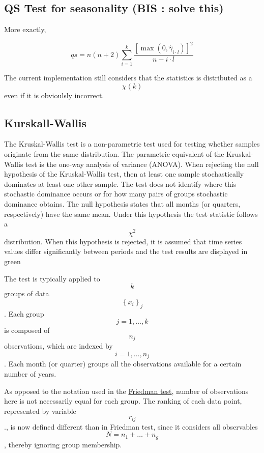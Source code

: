 \documentclass[
]{book}
\begin{document}
\hypertarget{qs-test-for-seasonality-bis-solve-this}{%
\subsection{QS Test for seasonality (BIS : solve this)}\label{qs-test-for-seasonality-bis-solve-this}}

More exactly,

\[ qs=n \left(n+2\right)\sum_{i=1}^k\frac{\left[ \max  \left(0, \hat\gamma_{i \cdot l}\right)\right]^2}{n-i \cdot l}\]

The current implementation still considers that the statistics is distributed as a
\[\chi \left(k\right)\]
even if it is obvioulsly incorrect.

\hypertarget{kurskall-wallis}{%
\subsection{Kurskall-Wallis}\label{kurskall-wallis}}

The Kruskal-Wallis test is a non-parametric test used for testing whether samples originate from the same distribution.
The parametric equivalent of the Kruskal-Wallis test is the one-way analysis of variance (ANOVA).
When rejecting the null hypothesis of the Kruskal-Wallis test, then at least one sample stochastically dominates at least one other sample.
The test does not identify where this stochastic dominance occurs or for how many pairs of groups stochastic dominance obtains.
The null hypothesis states that all months (or quarters, respectively) have the same mean.
Under this hypothesis the test statistic follows a \[ \chi^2 \] distribution.
When this hypothesis is rejected, it is assumed that time series values differ significantly between periods and the test results are displayed in green

The test is typically applied to \[ k  \] groups of data \[ \left\{x_{i}\right\}_{j} \]. Each group \[ j=1,…,k \] is composed of \[ n_j \] observations,
which are indexed by \[ i=1,…,n_j \]. Each month (or quarter) groups all the observations available for a certain number of years.

As opposed to the notation used in the \href{../theory/Tests_Friedman.html}{Friedman test}, number of observations here is not necessarily equal for each group.
The ranking of each data point, represented by variable \[ r_{ij} \]., is now defined different than in Friedman test,
since it considers all observables \[ N=n_1+ \dots + n_g \], thereby ignoring group membership.
\end{document}

